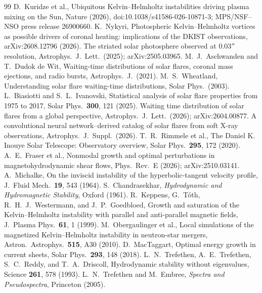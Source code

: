 \documentclass[11pt]{article}
\theoremstyle{definition}
\theoremstyle{remark}
\begin{document}
\begin{thebibliography}{99}
 D.~Kuridze et al., Ubiquitous Kelvin--Helmholtz
instabilities driving plasma mixing on the Sun, Nature (2026),
doi:10.1038/s41586-026-10871-3; MPS/NSF--NSO press release 26900660.
 K.~Nykyri, Photospheric Kelvin--Helmholtz vortices as
possible drivers of coronal heating: implications of the DKIST observations,
arXiv:2608.12796 (2026).
 The striated solar photosphere observed at $0.03''$
resolution, Astrophys.\ J.\ Lett.\ (2025); arXiv:2505.03965.
 M.~J.~Aschwanden and T.~Dudok de Wit, Waiting-time
distributions of solar flares, coronal mass ejections, and radio bursts,
Astrophys.\ J.\ (2021).
 M.~S.~Wheatland, Understanding solar flare waiting-time
distributions, Solar Phys.\ (2003).
 L.~Biasiotti and S.~L.~Ivanovski, Statistical analysis
of solar flare properties from 1975 to 2017, Solar Phys.\ \textbf{300}, 121
(2025).
 Waiting time distribution of solar flares from a global
perspective, Astrophys.\ J.\ Lett.\ (2026); arXiv:2604.00877.
 A convolutional neural network--derived catalog of solar
flares from soft X-ray observations, Astrophys.\ J.\ Suppl.\ (2026).
 T.~R.~Rimmele et al., The Daniel K. Inouye Solar
Telescope: Observatory overview, Solar Phys.\ \textbf{295}, 172 (2020).
 A.~E.~Fraser et al., Nonmodal growth and optimal
perturbations in magnetohydrodynamic shear flows, Phys.\ Rev.\ E (2026);
arXiv:2510.03141.
 A.~Michalke, On the inviscid instability of the
hyperbolic-tangent velocity profile, J.\ Fluid Mech.\ \textbf{19}, 543
(1964).
 S.~Chandrasekhar, \emph{Hydrodynamic and Hydromagnetic
Stability}, Oxford (1961).
 R.~Keppens, G.~T\'oth, R.~H.~J.~Westermann, and
J.~P.~Goedbloed, Growth and saturation of the Kelvin--Helmholtz instability
with parallel and anti-parallel magnetic fields, J.\ Plasma Phys.\
\textbf{61}, 1 (1999).
 M.~Obergaulinger et al., Local simulations of the
magnetized Kelvin--Helmholtz instability in neutron-star mergers, Astron.\
Astrophys.\ \textbf{515}, A30 (2010).
\bibitem{mactaggart} D.~MacTaggart, Optimal energy growth in current
sheets, Solar Phys.\ \textbf{293}, 148 (2018).
\bibitem{trefethen93} L.~N.~Trefethen, A.~E.~Trefethen, S.~C.~Reddy, and
T.~A.~Driscoll, Hydrodynamic stability without eigenvalues, Science
\textbf{261}, 578 (1993).
\bibitem{trefembree} L.~N.~Trefethen and M.~Embree, \emph{Spectra and
Pseudospectra}, Princeton (2005).

\end{thebibliography}
\end{document}
